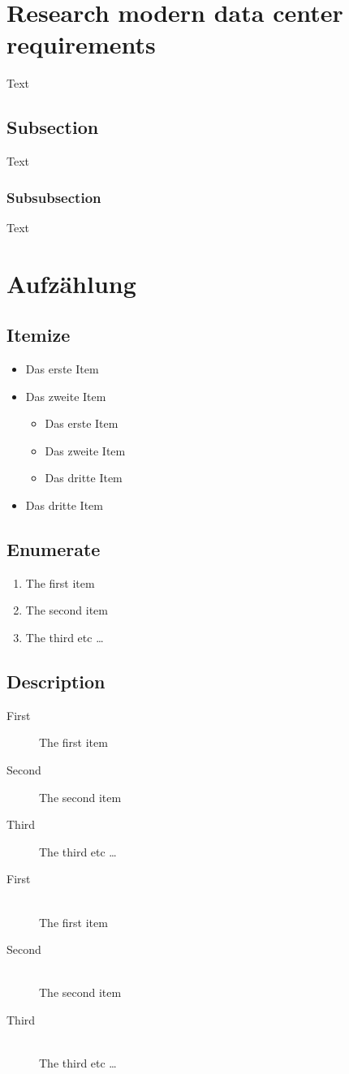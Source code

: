 \documentclass[a4,12pt]{scrartcl}
\begin{document}
\section{Research modern data center requirements}
Text


\subsection{Subsection}
Text


\subsubsection{Subsubsection}
Text

\section{Aufzählung}
\subsection{Itemize}
\begin{itemize}
\item Das erste Item
\item Das zweite Item
\begin{itemize}
\item Das erste Item
\item Das zweite Item
\item Das dritte Item
\end{itemize}
\item Das dritte Item
\end{itemize}

\subsection{Enumerate}
\begin{enumerate}
  \item The first item
  \item The second item
  \item The third etc \ldots
\end{enumerate}

\subsection{Description}
\begin{description}
  \item[First] The first item
  \item[Second] The second item
  \item[Third] The third etc \ldots
\end{description}
\begin{description}
  \item[First] \hfill \\
  The first item
  \item[Second] \hfill \\
  The second item
  \item[Third] \hfill \\
  The third etc \ldots
\end{description}
\end{document}
